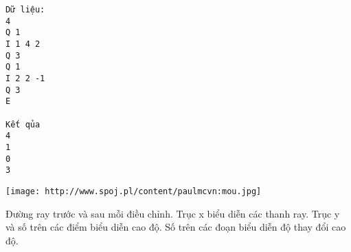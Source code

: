 \begin{verbatim}
Dữ liệu:
4
Q 1
I 1 4 2
Q 3
Q 1
I 2 2 -1
Q 3
E

Kết qủa
4
1
0
3
\end{verbatim}


\texttt{[image: http://www.spoj.pl/content/paulmcvn:mou.jpg]}

   Đường ray trước và sau mỗi điều chỉnh. Trục x biểu diễn các thanh ray. Trục y và số trên các điểm biểu diễn cao độ.   Số trên các đoạn biểu diễn độ thay đổi cao độ.
